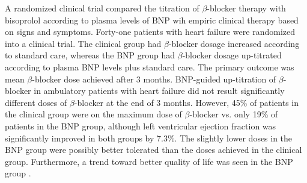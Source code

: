 \documentclass[14pt,a4paper,onecolumn]{extarticle}
\begin{document}
A  randomized clinical trial compared the titration of $\beta$-blocker therapy with bisoprolol according to plasma levels of BNP wih empiric clinical therapy based on signs and symptoms. Forty-one patients with heart failure were randomized into a clinical trial. The clinical group had $\beta$-blocker dosage increased according to standard care, whereas the BNP group had $\beta$-blocker dosage up-titrated according to plasma BNP levels plus standard care. The primary outcome was mean $\beta$-blocker dose achieved after 3 months. BNP-guided up-titration of $\beta$-blocker in ambulatory patients with heart failure did not result significantly different doses of $\beta$-blocker at the end of 3 months. However, 45\% of patients in the clinical group were on the maximum dose of $\beta$-blocker vs. only 19\% of patients in the BNP group, although left ventricular ejection fraction was significantly improved in both groups by 7.3\%. The slightly lower doses in the BNP group were possibly better tolerated than the doses achieved in the clinical group. Furthermore, a trend toward better quality of life was seen in the BNP group \citep{bib3294}.


\end{document}
